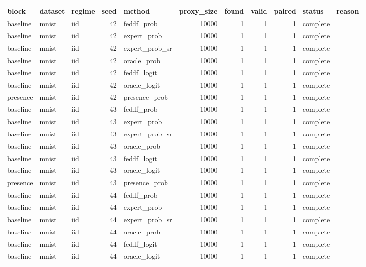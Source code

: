 \begin{tabular}{lllrlrrrrll}
\toprule
block & dataset & regime & seed & method & proxy\_size & found & valid & paired & status & reason \\
\midrule
baseline & mnist & iid & 42 & feddf\_prob & 10000 & 1 & 1 & 1 & complete &  \\
baseline & mnist & iid & 42 & expert\_prob & 10000 & 1 & 1 & 1 & complete &  \\
baseline & mnist & iid & 42 & expert\_prob\_sr & 10000 & 1 & 1 & 1 & complete &  \\
baseline & mnist & iid & 42 & oracle\_prob & 10000 & 1 & 1 & 1 & complete &  \\
baseline & mnist & iid & 42 & feddf\_logit & 10000 & 1 & 1 & 1 & complete &  \\
baseline & mnist & iid & 42 & oracle\_logit & 10000 & 1 & 1 & 1 & complete &  \\
presence & mnist & iid & 42 & presence\_prob & 10000 & 1 & 1 & 1 & complete &  \\
baseline & mnist & iid & 43 & feddf\_prob & 10000 & 1 & 1 & 1 & complete &  \\
baseline & mnist & iid & 43 & expert\_prob & 10000 & 1 & 1 & 1 & complete &  \\
baseline & mnist & iid & 43 & expert\_prob\_sr & 10000 & 1 & 1 & 1 & complete &  \\
baseline & mnist & iid & 43 & oracle\_prob & 10000 & 1 & 1 & 1 & complete &  \\
baseline & mnist & iid & 43 & feddf\_logit & 10000 & 1 & 1 & 1 & complete &  \\
baseline & mnist & iid & 43 & oracle\_logit & 10000 & 1 & 1 & 1 & complete &  \\
presence & mnist & iid & 43 & presence\_prob & 10000 & 1 & 1 & 1 & complete &  \\
baseline & mnist & iid & 44 & feddf\_prob & 10000 & 1 & 1 & 1 & complete &  \\
baseline & mnist & iid & 44 & expert\_prob & 10000 & 1 & 1 & 1 & complete &  \\
baseline & mnist & iid & 44 & expert\_prob\_sr & 10000 & 1 & 1 & 1 & complete &  \\
baseline & mnist & iid & 44 & oracle\_prob & 10000 & 1 & 1 & 1 & complete &  \\
baseline & mnist & iid & 44 & feddf\_logit & 10000 & 1 & 1 & 1 & complete &  \\
baseline & mnist & iid & 44 & oracle\_logit & 10000 & 1 & 1 & 1 & complete &  \\

\end{tabular}
